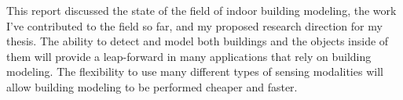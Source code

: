\documentclass[journal]{IEEEtran}
\begin{document}
This report discussed the state of the field of indoor building modeling, the work I've contributed to the field so far, and my proposed research direction for my thesis.  The ability to detect and model both buildings and the objects inside of them will provide a leap-forward in many applications that rely on building modeling.  The flexibility to use many different types of sensing modalities will allow building modeling to be performed cheaper and faster.



%

\vfill

\end{document}
